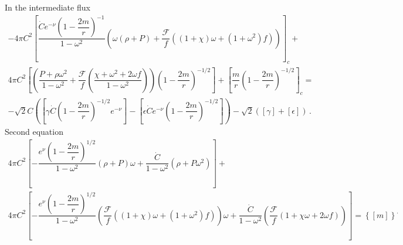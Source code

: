 \documentclass[notitlepage,letterpaper, 10pt]{article}
\begin{document}
In the intermediate flux
\begin{align}
    -4\pi C^{2} \left[ \dfrac{\dot{C}e^{-\nu}\left(1-\dfrac{2m}{r} \right)^{-1}}{1-\omega^2} \left(\omega \left( \rho + P \right) + \dfrac{\mathcal{F}}{f}\left( \left(1+ \chi \right)\omega + \left( 1+\omega^{2}\right)f\right) \right) \right]_{c} + \quad \quad
    \nonumber \\
    4\pi C^{2} \left[ \left( \dfrac{P + \rho \omega^{2}}{1-\omega^{2}}+ \dfrac{\mathcal{F}}{f}\left(\dfrac{\chi + \omega^{2}+2\omega f}{1-\omega^{2}}\right)\right) \left( 1-\dfrac{2m}{r} \right)^{-1/2} \right] + \left[\dfrac{m}{r}\left( 1-\dfrac{2m}{r} \right)^{-1/2} \right]_{c}= \quad \quad \nonumber \\ 
 -\sqrt{2}C \left( \left[ \gamma \dot{C}\left( 1-\dfrac{2m}{r} \right)^{-1/2} e^{-\nu}\right]- \left[ \epsilon \dot{C} e^{-\nu}\left( 1-\dfrac{2m}{r} \right)^{-1/2}\right]\right)- \sqrt{2} \left(\left[ \gamma\right] + \left[ \epsilon \right] \right)\, .
\end{align}
Second equation 
\begin{align}
     4 \pi C^{2} \left[ -\dfrac{e^{\nu}\left( 1-\dfrac{2m}{r} \right)^{1/2}}{1-\omega^{2}}\left( \rho + P \right)\omega + \dfrac{\dot{C}}{1-\omega^{2}}\left(\rho + P\omega^{2} \right) \right]+
\nonumber \\
4 \pi C^{2} \left[-\dfrac{e^{\nu}\left( 1-\dfrac{2m}{r} \right)^{1/2}}{1-\omega^{2}}\left( \dfrac{\mathcal{F}}{f}\left(\left( 1+\chi\right)\omega + \left(1+\omega^{2} \right)f\right) \right)\omega + \dfrac{\dot{C}}{1-\omega^{2}}\left(\dfrac{\mathcal{F}}{f}\left(1+\chi \omega + 2\omega f \right)\right) \right] = \left \{ \left[m \right] \right \}^{.}
\end{align}
\end{document}
